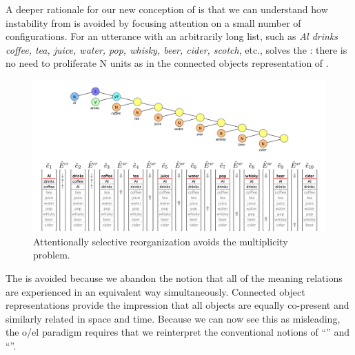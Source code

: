   A deeper rationale for our new conception of   is that we can understand how instability from  is avoided by focusing attention on a small number of configurations.  For an utterance with an arbitrarily long list, such as \textit{Al drinks coffee, tea, juice, water, pop, whisky, beer, cider, scotch}, etc.,   solves the : there is no need to proliferate N units as in the connected objects representation of {}. 

  
\begin{figure}
\includegraphics[width=\textwidth]{figures/Tilsen-img104.png}
\caption{Attentionally selective reorganization avoids the multiplicity problem.}
\label{fig:4:54}
\end{figure}
 

  The  is avoided because we abandon the notion that all of the meaning relations are experienced in an equivalent way simultaneously. Connected object representations provide the impression that all objects are equally co-present and similarly related in space and time. Because we can now see this as misleading, the o/el paradigm requires that we reinterpret the conventional notions of “” and “”.

